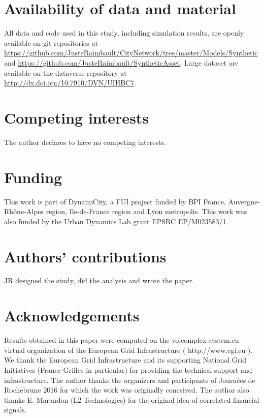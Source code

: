 \documentclass{article}
\begin{document}
\section*{Availability of data and material}

All data and code used in this study, including simulation results, are openly available on git repositories at \url{https://github.com/JusteRaimbault/CityNetwork/tree/master/Models/Synthetic} and \url{https://github.com/JusteRaimbault/SyntheticAsset}. Large dataset are available on the dataverse repository at \url{http://dx.doi.org/10.7910/DVN/UIHBC7}.

\vspace{-0.2cm}


\section*{Competing interests}

The author declares to have no competing interests.

\vspace{-0.2cm}

\section*{Funding}

This work is part of DynamiCity, a FUI project funded by BPI France, Auvergne-Rh{\^o}ne-Alpes region, Ile-de-France region and Lyon metropolis. This work was also funded by the Urban Dynamics Lab grant EPSRC EP/M023583/1.

\vspace{-0.2cm}

\section*{Authors' contributions}

JR designed the study, did the analysis and wrote the paper.

\vspace{-0.2cm}

\section*{Acknowledgements}

Results obtained in this paper were computed on the vo.complex-system.eu virtual organization of the European Grid Infrastructure ( http://www.egi.eu ). We thank the European Grid Infrastructure and its supporting National Grid Initiatives (France-Grilles in particular) for providing the technical support and infrastructure. The author thanks the organizers and participants of Journ{\'e}es de Rochebrune 2016 for which the work was originally conceived. The author also thanks E. Marandon (L2 Technologies) for the original idea of correlated financial signals.
\end{document}
